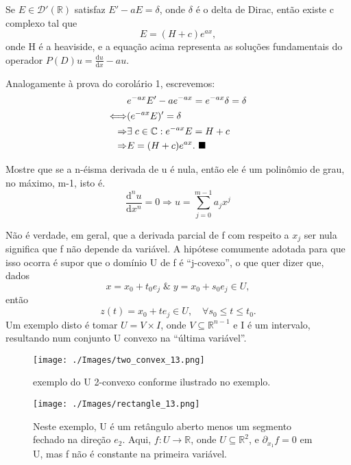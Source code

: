 \documentclass[../distribution_theory_notes.tex]{subfiles}
\begin{document}
     \begin{crl*}[Escólio 2]
      Se \(E\in \mathcal{D}'(\mathbb{R})\) satisfaz \(E' - a E = \delta \), onde \(\delta \) é o delta de Dirac, então existe c complexo tal que  
        \[
          E = (H+c)e^{ax},
        \]
        onde H é a heaviside, e a equação acima representa as soluções fundamentais do operador \(P(D)u = \frac{\mathrm{d}u}{\mathrm{d}x}-au.\)
    \end{crl*}
   \begin{proof*}
     Analogamente à prova do corolário 1, escrevemos:
     \begin{align*}
      & e^{-ax}E'-ae^{-ax}=e^{-ax}\delta =\delta \\ 
      \Longleftrightarrow & (e^{-ax}E)' = \delta \\ 
                          \Rightarrow &\exists\; c\in \mathbb{C}: e^{-ax}E = H+c\\ 
                          \Rightarrow & E = (H+c)e^{ax}. \text{ $\blacksquare$}
     \end{align*}
   \end{proof*}
   \begin{exr}
      Mostre que se a n-éisma derivada de u é nula, então ele é um polinômio de grau, no máximo, m-1, isto é. 
      \[
        \frac{\mathrm{d}^{n}u}{\mathrm{d}x^{n}}=0 \Rightarrow u = \sum\limits_{j=0}^{m-1}a_{j}x^{j}
      \]
   \end{exr}

   Não é verdade, em geral, que a derivada parcial de f com respeito a \(x_{j}\) ser nula significa que f não depende da variável. A hipótese comumente adotada para que isso ocorra é supor que o domínio U de f é ``j-covexo'', o que quer dizer que, dados 
     \[
       x=x_{0}+t_{0}e_{j}\;\&\; y=x_{0}+s_{0}e_{j}\in U,
     \]
     então 
       \[
         z(t)=x_{0}+te_{j}\in U,\quad \forall s_{0}\leq t\leq t_{0}.
       \]
       Um exemplo disto é tomar \(U = V \times I\), onde \(V\subseteq \mathbb{R}^{n-1}\) e I é um intervalo, resultando num conjunto U convexo na ``última variável''.
      \begin{figure}[H]
      \begin{center}
      \texttt{[image: ./Images/two\_convex\_13.png]}
      \end{center}
      \caption{exemplo do U 2-convexo conforme ilustrado no exemplo.}
      \end{figure}

     \begin{figure}[H]
     \begin{center}
     \texttt{[image: ./Images/rectangle\_13.png]}
     \end{center}
     \caption{Neste exemplo, U é um retângulo aberto menos um segmento fechado na direção \(e_2\). Aqui, \(f:U\rightarrow \mathbb{R}\), onde \(U\subseteq \mathbb{R}^{2}\), e \(\partial_{x_1} f = 0\) em U, mas f não é constante na primeira variável.}
     \end{figure}
\end{document}
